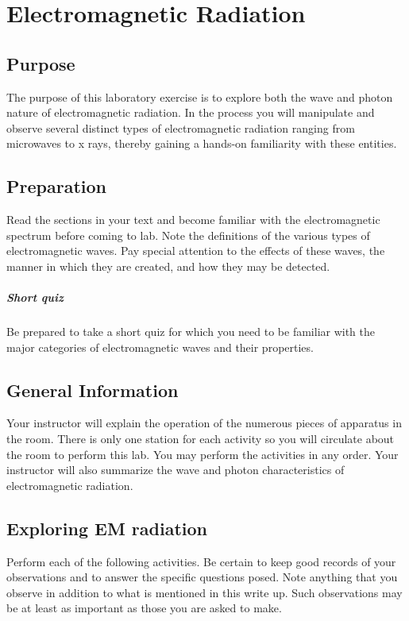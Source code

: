 \chapter{Electromagnetic Radiation}

\section{Purpose}
  The purpose of this laboratory exercise is to explore both the wave and photon nature of electromagnetic radiation.  In the process you will manipulate and observe several distinct types of electromagnetic radiation ranging from microwaves to x rays, thereby gaining a hands-on familiarity with these entities.

\section{Preparation}
  Read the sections in your text and become familiar with the electromagnetic spectrum before coming to lab.  Note the definitions of the various types of electromagnetic waves.  Pay special attention to the effects of these waves, the manner in which they are created, and how they may be detected.

\paragraph{Short quiz}
  Be prepared to take a short quiz for which you need to be familiar with the major categories of electromagnetic waves and their properties.
\section{General Information}

Your instructor will explain the operation of the numerous pieces of apparatus in the room.  There is only one station for each activity so you will circulate about the room to perform this lab.  You may perform the activities in any order.
Your instructor will also summarize the wave and photon characteristics of electromagnetic radiation.

\section{Exploring EM radiation}
Perform each of the following activities.  Be certain to keep good records of your observations and to answer the specific questions posed.  Note anything that you observe in addition to what is mentioned in this write up.  Such observations may be at least as important as those you are asked to make.

